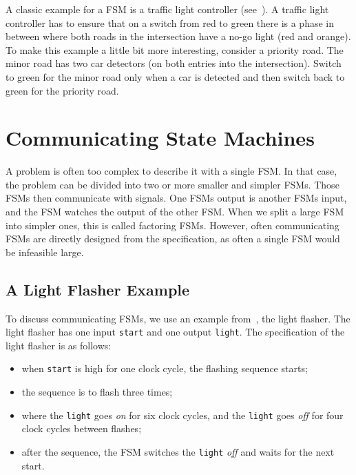 \documentclass[%
    10pt,
    headinclude, footexclude,
    openright, %
    notitlepage,
    cleardoubleempty,
    headsepline,
    pointlessnumbers,
    bibtotoc, idxtotoc,
    ]{scrbook}
\newcommand{\code}[1]{{\small{\texttt{#1}}}}
\newcommand{\todo}[1]{{\emph{TODO: #1}}}
\renewcommand{\todo}[1]{}
\begin{document}
A classic example for a FSM is a traffic light controller (see~\cite[Section~14.3]{dally:vhdl:2016}).
A traffic light controller has to ensure that on a switch from red to green
there is a phase in between where both roads in the intersection
have a no-go light (red and orange).
To make this example a little bit more interesting, consider a priority road.
The minor road has two car detectors (on both entries into the intersection).
Switch to green for the minor road only when a car is detected and then switch
back to green for the priority road.

\todo{Luca: Greatest common divisor with Euclide algorithm can be also a nice exercise.
Martin: but this is shown at the Chisel homepage without an FSM.}

\todo{Here a more interesting exercise. And not one from Dally.}

\chapter{Communicating State Machines}

A problem is often too complex to describe it with a single FSM.
In that case, the problem can be divided into two or more smaller and simpler FSMs.
Those FSMs then communicate with signals. One FSMs output is
another FSMs input, and the FSM watches the output of the other FSM.
When we split a large FSM into simpler ones, this is called factoring FSMs.
However, often communicating FSMs are directly designed from the specification,
as often a single FSM would be infeasible large.

\section{A Light Flasher Example}

To discuss communicating FSMs, we use an example
from~\cite[Chapter~17]{dally:vhdl:2016}, the light flasher.
The light flasher has one input \code{start} and one output
\code{light}. The specification of the light flasher is as follows:
\begin{itemize}
\item when \code{start} is high for one clock cycle, the flashing
sequence starts;
\item the sequence is to flash three times;
\item where the \code{light} goes \emph{on} for six clock cycles, and the \code{light} goes \emph{off} for four clock cycles between flashes;
\item after the sequence, the FSM switches the \code{light} \emph{off} and waits
for the next start.
\end{itemize}
\end{document}
